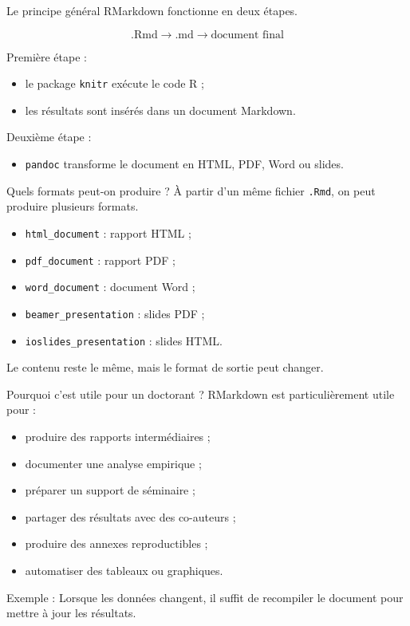 \documentclass[
  10pt,
  ignorenonframetext,
]{beamer}
\providecommand{\tightlist}{%
  \setlength{\itemsep}{0pt}\setlength{\parskip}{0pt}}
\begin{document}
\begin{frame}[fragile]{Le principe général}
\label{le-principe-guxe9nuxe9ral}
RMarkdown fonctionne en deux étapes.

\[
\text{.Rmd}
\rightarrow
\text{.md}
\rightarrow
\text{document final}
\]

Première étape :

\begin{itemize}
\tightlist
\item
  le package \texttt{knitr} exécute le code R ;
\item
  les résultats sont insérés dans un document Markdown.
\end{itemize}

Deuxième étape :

\begin{itemize}
\tightlist
\item
  \texttt{pandoc} transforme le document en HTML, PDF, Word ou slides.
\end{itemize}
\end{frame}

\begin{frame}[fragile]{Quels formats peut-on produire ?}
\label{quels-formats-peut-on-produire}
À partir d'un même fichier \texttt{.Rmd}, on peut produire plusieurs
formats.

\begin{itemize}
  \item \texttt{html\_document} : rapport HTML ;
  \item \texttt{pdf\_document} : rapport PDF ;
  \item \texttt{word\_document} : document Word ;
  \item \texttt{beamer\_presentation} : slides PDF ;
  \item \texttt{ioslides\_presentation} : slides HTML.
\end{itemize}

Le contenu reste le même, mais le format de sortie peut changer.
\end{frame}

\begin{frame}{Pourquoi c'est utile pour un doctorant ?}
\label{pourquoi-cest-utile-pour-un-doctorant}
RMarkdown est particulièrement utile pour :

\begin{itemize}
\tightlist
\item
  produire des rapports intermédiaires ;
\item
  documenter une analyse empirique ;
\item
  préparer un support de séminaire ;
\item
  partager des résultats avec des co-auteurs ;
\item
  produire des annexes reproductibles ;
\item
  automatiser des tableaux ou graphiques.
\end{itemize}

Exemple : Lorsque les données changent, il suffit de recompiler le
document pour mettre à jour les résultats.
\end{frame}
\end{document}
